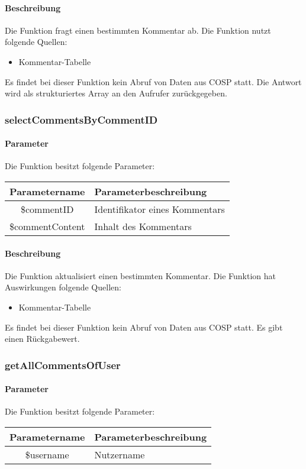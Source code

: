 \paragraph{Beschreibung} Die Funktion fragt einen bestimmten Kommentar ab. Die Funktion nutzt folgende Quellen:
\begin{itemize}
	\item Kommentar-Tabelle
\end{itemize}
Es findet bei dieser Funktion kein Abruf von Daten aus {\glqq COSP\grqq} statt. Die Antwort wird als strukturiertes Array an den Aufrufer zurückgegeben.
\subsubsection{selectCommentsByCommentID}
\paragraph{Parameter} Die Funktion besitzt folgende Parameter:
\begin{table}[H]
	\begin{tabular}{|c|p{11cm}|}
		\hline
		\textbf{Parametername} & \textbf{Parameterbeschreibung} \\ \hline
		\$commentID      & Identifikator eines Kommentars \\ \hline
		\$commentContent & Inhalt des Kommentars \\ \hline
	\end{tabular}
\end{table}
\paragraph{Beschreibung} Die Funktion aktualisiert einen bestimmten Kommentar. Die Funktion hat Auswirkungen folgende Quellen:
\begin{itemize}
	\item Kommentar-Tabelle
\end{itemize}
Es findet bei dieser Funktion kein Abruf von Daten aus {\glqq COSP\grqq} statt. Es gibt einen Rückgabewert.
\subsubsection{getAllCommentsOfUser}
\paragraph{Parameter} Die Funktion besitzt folgende Parameter:
\begin{table}[H]
	\begin{tabular}{|c|p{11cm}|}
		\hline
		\textbf{Parametername} & \textbf{Parameterbeschreibung} \\ \hline
		\$username & Nutzername \\ \hline
	\end{tabular}
\end{table}
